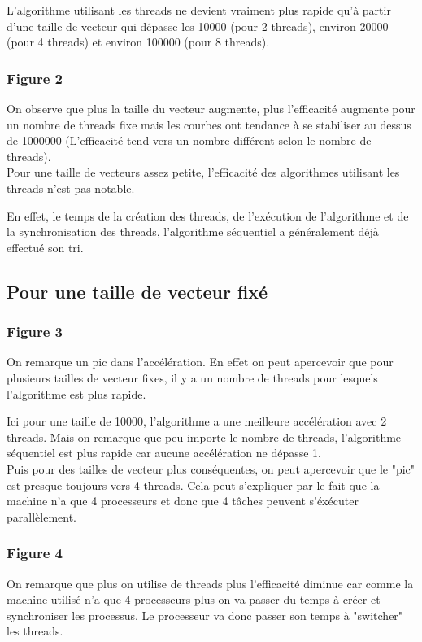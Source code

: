 \documentclass{article}
\begin{document}
L'algorithme utilisant les threads ne devient vraiment plus rapide qu'à partir d'une taille de vecteur qui dépasse les 10000 (pour 2  threads), environ 20000 (pour 4 threads) et environ 100000 (pour 8 threads).

\subsubsection*{Figure 2}
On observe que plus la taille du vecteur augmente, plus l'efficacité augmente pour un nombre de threads fixe mais les courbes ont tendance à se stabiliser au dessus de 1000000 (L'efficacité tend vers un nombre différent selon le nombre de threads).\\

Pour une taille de vecteurs assez petite, l'efficacité des algorithmes utilisant les threads n'est pas notable.

En effet, le temps de la création des threads, de l'exécution de l'algorithme et de la synchronisation des threads, l'algorithme séquentiel a généralement déjà effectué son tri.\\

\subsection*{Pour une taille de vecteur fixé}

\subsubsection*{Figure 3}

On remarque un pic dans l'accélération. En effet on peut apercevoir que pour plusieurs tailles de vecteur fixes, il y a un nombre de threads pour lesquels l'algorithme est plus rapide.

Ici pour une taille de 10000, l'algorithme a une meilleure accélération avec 2 threads. Mais on remarque que peu importe le nombre de threads, l'algorithme séquentiel est plus rapide car aucune accélération ne dépasse 1.\\

Puis pour des tailles de vecteur plus conséquentes, on peut apercevoir que le "pic" est presque toujours vers 4 threads. Cela peut s'expliquer par le fait que la machine n'a que 4 processeurs et donc que 4 tâches peuvent s'éxécuter parallèlement.

\subsubsection*{Figure 4}

On remarque que plus on utilise de threads plus l'efficacité diminue car comme la machine utilisé n'a que 4 processeurs plus on va passer du temps à créer et synchroniser les processus. Le processeur va donc passer son temps à "switcher" les threads.
\end{document}
